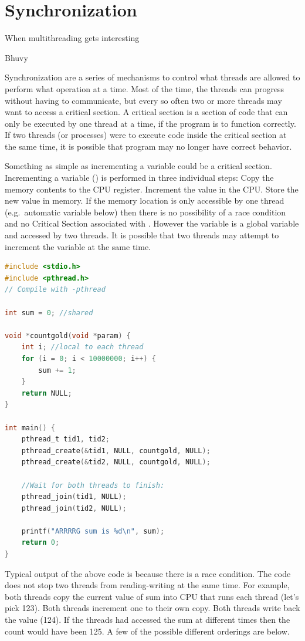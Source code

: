 \chapter{Synchronization}

\epigraph{When multithreading gets interesting}{Bhuvy}

Synchronization are a series of mechanisms to control what threads are allowed to perform what operation at a time. Most of the time, the threads can progress without having to communicate, but every so often two or more threads may want to access a critical section. A critical section is a section of code that can only be executed by one thread at a time, if the program is to function correctly. If two threads (or processes) were to execute code inside the critical section at the same time, it is possible that program may no longer have correct behavior.

Something as simple as incrementing a variable could be a critical section. Incrementing a variable () is performed in three individual steps: Copy the memory contents to the CPU register. Increment the value in the CPU. Store the new value in memory. If the memory location is only accessible by one thread (e.g.~automatic variable  below) then there is no possibility of a race condition and no Critical Section associated with . However the  variable is a global variable and accessed by two threads. It is possible that two threads may attempt to increment the variable at the same time.

\begin{lstlisting}[language=C]
#include <stdio.h>
#include <pthread.h>
// Compile with -pthread

int sum = 0; //shared

void *countgold(void *param) {
    int i; //local to each thread
    for (i = 0; i < 10000000; i++) {
        sum += 1;
    }
    return NULL;
}

int main() {
    pthread_t tid1, tid2;
    pthread_create(&tid1, NULL, countgold, NULL);
    pthread_create(&tid2, NULL, countgold, NULL);
    
    //Wait for both threads to finish:
    pthread_join(tid1, NULL);
    pthread_join(tid2, NULL);
    
    printf("ARRRRG sum is %d\n", sum);
    return 0;
}
\end{lstlisting}

Typical output of the above code is  because there is a race condition. The code does not stop two threads from reading-writing  at the same time. For example, both threads copy the current value of sum into CPU that runs each thread (let's pick 123). Both threads increment one to their own copy. Both threads write back the value (124). If the threads had accessed the sum at different times then the count would have been 125. A few of the possible different orderings are below.

